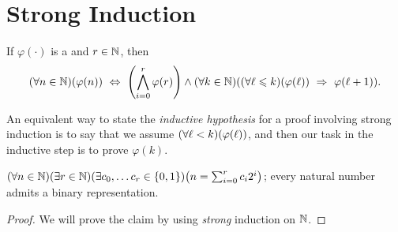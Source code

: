 \section{Strong Induction}
\begin{theorem}\label{thm:stronginduction}
    If $\varphi(\cdot)$ is a {\wff} and $r \in \mathbb{N}$, then
    \[
        \pn*{\forall n \in \N}\pn*{\varphi(n)}
        \iff \pn*{\bigmeet_{i = 0}^{r}\varphi(r)}
        \meet \pn*{\forall k \in \N}\pn*{\pn*{\forall \ell \leq k}\pn*{\varphi(\ell)} \implies \varphi(\ell + 1)}.
    \]
\end{theorem}
\begin{note}
    An equivalent way to state the \emph{inductive hypothesis} for a proof involving strong induction
    is to say that we assume $\pn*{\forall \ell < k}\pn*{\varphi(\ell)}$,
    and then our task in the inductive step is to prove $\varphi(k)$.
\end{note}

\begin{example}
    $\pn*{\forall n \in \N}\pn*{\exists r \in \N}\pn*{\exists c_0, \dots c_r \in \set*{0, 1}}\pn*{n = \sum_{i = 0}^{r}c_i 2^i}$;
    \ie every natural number admits a binary representation.
\end{example}
\begin{proof}
    We will prove the claim by using \emph{strong} induction on $\mathbb{N}$.
\end{proof}


